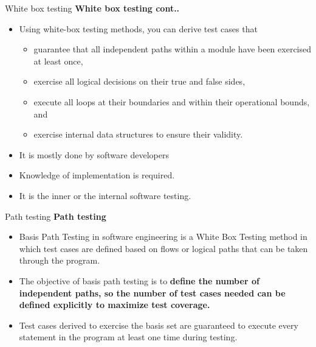 \documentclass{beamer}
\begin{document}
\begin{frame}{White box testing}
	\textbf{White box testing cont..}
	\begin{itemize}
		\item Using white-box testing methods, you can derive test cases that 
		\begin{itemize}
			\item guarantee that all independent paths within a module have been exercised at least once, 
			\item exercise all logical decisions on their true and false sides, 
			\item execute all loops at their boundaries and within their operational bounds, and 
			\item exercise internal data structures to ensure their validity.
			
		\end{itemize}
	\item It is mostly done by software developers
	\item Knowledge of implementation is required.
	\item It is the inner or the internal software testing.
	
	\end{itemize}
\end{frame}
\begin{frame}{Path testing}
	\textbf{Path testing}
	\begin{itemize}
		\item Basis Path Testing in software engineering is a White Box Testing method in which test cases are defined based on flows or logical paths that can be taken through the program. 
		\item The objective of basis path testing is to\textbf{ define the number of independent paths, so the number of test cases needed can be defined explicitly to maximize test coverage.}
		\item Test cases derived to exercise the basis set are guaranteed to execute every statement in the program at least one time during testing.
	\end{itemize}
\end{frame}
\end{document}
